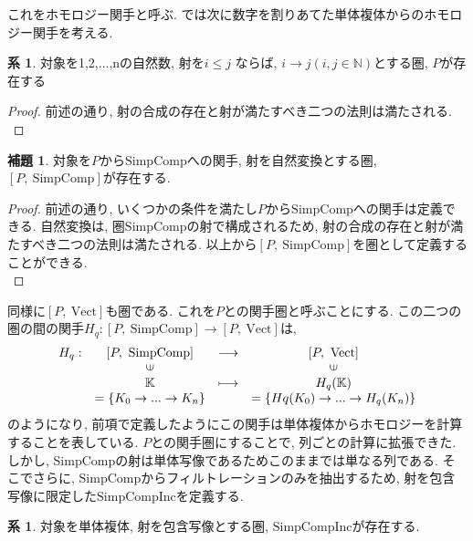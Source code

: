 \documentclass[a4paper]{jsarticle}
\theoremstyle{definition}
\newtheorem{lem}[dfn]{補題}
\newtheorem{cor}[dfn]{系}
\newcommand{\SimpComp}{{\mathrm{SimpComp}}}
\newcommand{\Fun}[2]{[#1,~#2]}
\newcommand{\Vect}{{\mathrm{Vect}}}
\newcommand{\SimpCompInc}{{\mathrm{SimpCompInc}}}
\begin{document}
これをホモロジー関手と呼ぶ. では次に数字を割りあてた単体複体からのホモロジー関手を考える.
\begin{cor}
    対象を1,2,...,nの自然数, 射を$i \leq j$ ならば,  $i\rightarrow j(i, j \in \mathbb{N})$とする圏, $P$が存在する
\end{cor}
\begin{proof}
    前述の通り, 射の合成の存在と射が満たすべき二つの法則は満たされる.\\
\end{proof}  
\begin{lem}
    対象を$P$から$\SimpComp$への関手, 射を自然変換とする圏, $\Fun{P}{\SimpComp}$が存在する.
\end{lem}
\begin{proof}
    前述の通り, いくつかの条件を満たし$P$から$\SimpComp$への関手は定義できる. 自然変換は, 圏$\SimpComp$の射で構成されるため, 射の合成の存在と射が満たすべき二つの法則は満たされる. 以上から$\Fun{P}{\SimpComp}$を圏として定義することができる.\\
\end{proof}
同様に$\Fun{P}{\Vect}$も圏である. これを$P$との関手圏と呼ぶことにする. この二つの圏の間の関手$H_q:\Fun{P}{\SimpComp}\rightarrow \Fun{P}{\Vect}$は,
\begin{equation}
    \begin{array}{cccc}
         H_q:& \Fun{P}{\SimpComp} & \longrightarrow & \Fun{P}{\Vect} \\
        & \rotatebox{90}{$\in$} & & \rotatebox{90}{$\in$} \\
        & \mathbb{K}& \longmapsto & H_q(\mathbb{K})\\
         & =\{K_0\rightarrow ...\rightarrow K_n\} &  & =\{Hq(K_0)\rightarrow ...\rightarrow H_q(K_n)\}\\
    \end{array}
\end{equation}
のようになり, 前項で定義したようにこの関手は単体複体からホモロジーを計算することを表している. $P$との関手圏にすることで, 列ごとの計算に拡張できた. しかし, SimpCompの射は単体写像であるためこのままでは単なる列である. 
そこでさらに, $\SimpComp$からフィルトレーションのみを抽出するため, 射を包含写像に限定した$\SimpCompInc$を定義する. 
\begin{cor}
    対象を単体複体, 射を包含写像とする圏, $\SimpCompInc$が存在する.
\end{cor}
\end{document}
